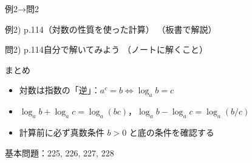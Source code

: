 \documentclass[aspectratio=43,professionalfonts,handout]{beamer}
\begin{document}
\begin{frame}{例2→問2}
  \begin{exampleblock}{例2) p.114（対数の性質を使った計算）}
    （板書で解説）
  \end{exampleblock}

  \vfill

  \begin{block}{問2) p.114\quad 自分で解いてみよう}
    （ノートに解くこと）
  \end{block}
\end{frame}

\begin{frame}{まとめ}
  \begin{itemize}
    \item 対数は指数の「逆」：$a^c = b \Leftrightarrow \log_a b = c$
    \item $\log_a b + \log_a c = \log_a(bc)$，$\log_a b - \log_a c = \log_a(b/c)$
    \item 計算前に必ず真数条件 $b > 0$ と底の条件を確認する
  \end{itemize}

  \vfill
  {\small 基本問題：225, 226, 227, 228}
\end{frame}
\end{document}
